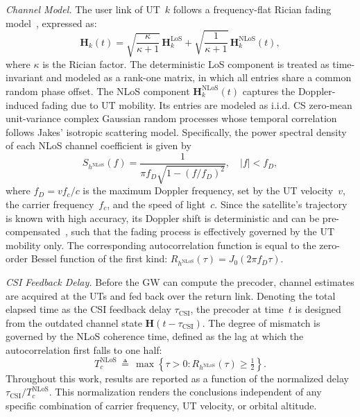 \documentclass[conference]{IEEEtran}
\begin{document}
\textit{Channel Model.}
The user link of \ac{UT}~$k$ follows a frequency-flat Rician fading model~\cite{mimo_over_satellite_review}, expressed as:
\begin{equation}
\label{eq:rician_channel}
    \mathbf{H}_k(t) = \sqrt{\frac{\kappa}{\kappa+1}}\,\mathbf{H}_k^{\mathrm{LoS}} + \sqrt{\frac{1}{\kappa+1}}\,\mathbf{H}_k^{\mathrm{NLoS}}(t),
\end{equation}
where $\kappa$ is the Rician factor.
The deterministic \ac{LoS} component is treated as time-invariant and modeled as a rank-one matrix, in which all entries share a common random phase offset.
The \ac{NLoS} component $\mathbf{H}_k^{\mathrm{NLoS}}(t)$ captures the Doppler-induced fading due to \ac{UT} mobility.
Its entries are modeled as \acs{i.i.d.} \ac{CS} zero-mean unit-variance complex Gaussian random processes whose temporal correlation follows Jakes' isotropic scattering model. Specifically, the power spectral density of each \ac{NLoS} channel coefficient is given by
\begin{equation}
\label{eq:acf}
    S_{h^{\mathrm{NLoS}}}(f) = \frac{1}{\pi f_D \sqrt{1 - (f/f_D)^2}}, \quad |f| < f_D,
\end{equation}
where $f_D = vf_c/c$ is the maximum Doppler frequency, set by the \ac{UT} velocity~$v$, the carrier frequency~$f_c$, and the speed of light~$c$. Since the satellite's trajectory is known with high accuracy, its Doppler shift is deterministic and can be pre-compensated~\cite{leo_satellite_doppler_compensation}, such that the fading process is effectively governed by the \ac{UT} mobility only.
The corresponding autocorrelation function is equal to the zero-order Bessel function of the first kind: $R_{h^{\mathrm{NLoS}}}(\tau) = J_0(2\pi f_D \tau)$.

\textit{\acs*{CSI} Feedback Delay.}
Before the \ac{GW} can compute the precoder, channel estimates are acquired at the \acp{UT} and fed back over the return link.
Denoting the total elapsed time as the \ac{CSI} feedback delay $\tau_{\mathrm{CSI}}$, the precoder at time~$t$ is designed from the outdated channel state $\mathbf{H}(t - \tau_{\mathrm{CSI}})$.
The degree of mismatch is governed by the \ac{NLoS} coherence time, defined as the lag at which the autocorrelation first falls to one half:
\begin{equation}
\label{eq:coherence_time}
    T_c^{\mathrm{NLoS}} \,\triangleq\, \max\!\left\{\tau > 0 : R_{h^{\mathrm{NLoS}}}(\tau) \geq \tfrac{1}{2}\right\}.
\end{equation}
Throughout this work, results are reported as a function of the normalized delay $\tau_{\mathrm{CSI}}/T_c^{\mathrm{NLoS}}$.
This normalization renders the conclusions independent of any specific combination of carrier frequency, \ac{UT} velocity, or orbital altitude.
\end{document}
